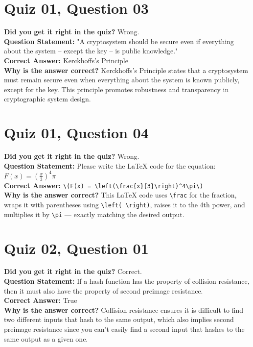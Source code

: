 \documentclass{article}
\begin{document}
\vspace{0.5cm}

\section*{Quiz 01, Question 03}
\textbf{Did you get it right in the quiz?} Wrong. \\
\textbf{Question Statement:} "A cryptosystem should be secure even if everything about the system -- except the key -- is public knowledge." \\
\textbf{Correct Answer:} Kerckhoffs's Principle \\
\textbf{Why is the answer correct?} Kerckhoffs's Principle states that a cryptosystem must remain secure even when everything about the system is known publicly, except for the key. This principle promotes robustness and transparency in cryptographic system design.


\vspace{5.5cm}

\section*{Quiz 01, Question 04}
\textbf{Did you get it right in the quiz?} Wrong. \\
\textbf{Question Statement:} Please write the LaTeX code for the equation: \( F(x) = \left(\frac{x}{3}\right)^4\pi \) \\
\textbf{Correct Answer:} \verb|\(F(x) = \left(\frac{x}{3}\right)^4\pi\)| \\
\textbf{Why is the answer correct?} This LaTeX code uses \verb|\frac| for the fraction, wraps it with parentheses using \verb|\left( \right)|, raises it to the 4th power, and multiplies it by \verb|\pi| — exactly matching the desired output.

\vspace{1em}

\section*{Quiz 02, Question 01} 
\textbf{Did you get it right in the quiz?} Correct. \\
\textbf{Question Statement:} If a hash function has the property of collision resistance, then it must also have the property of second preimage resistance. \\
\textbf{Correct Answer:} True \\
\textbf{Why is the answer correct?} Collision resistance ensures it is difficult to find two different inputs that hash to the same output, which also implies second preimage resistance since you can't easily find a second input that hashes to the same output as a given one.
\end{document}
